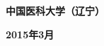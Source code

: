 \begin{titlepage}
\begin{center}
    \vspace{4cm}
    \heiti \fontsize{15pt}{13pt}\selectfont
    {\bfseries 中国医科大学（辽宁）}
\end{center}

\begin{center}
    \heiti \fontsize{16pt}{13pt}\selectfont
     {\bfseries 2015年3月}
\end{center}

\vspace{0.5cm}

\end{titlepage}
\newpage
